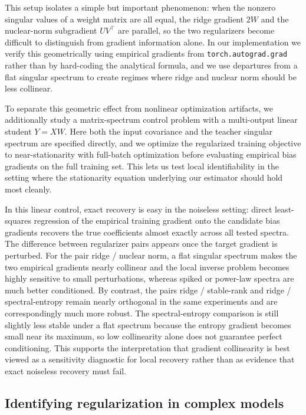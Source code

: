 \documentclass[10pt]{article}
\begin{document}
This setup isolates a simple but important phenomenon: when the nonzero singular values of a weight matrix are all equal, the ridge gradient $2W$ and the nuclear-norm subgradient $UV^\top$ are parallel, so the two regularizers become difficult to distinguish from gradient information alone. In our implementation we verify this geometrically using empirical gradients from \texttt{torch.autograd.grad} rather than by hard-coding the analytical formula, and we use departures from a flat singular spectrum to create regimes where ridge and nuclear norm should be less collinear.

To separate this geometric effect from nonlinear optimization artifacts, we additionally study a matrix-spectrum control problem with a multi-output linear student \(Y = XW\). Here both the input covariance and the teacher singular spectrum are specified directly, and we optimize the regularized training objective to near-stationarity with full-batch optimization before evaluating empirical bias gradients on the full training set. This lets us test local identifiability in the setting where the stationarity equation underlying our estimator should hold most cleanly.

In this linear control, exact recovery is easy in the noiseless setting: direct least-squares regression of the empirical training gradient onto the candidate bias gradients recovers the true coefficients almost exactly across all tested spectra. The difference between regularizer pairs appears once the target gradient is perturbed. For the pair ridge / nuclear norm, a flat singular spectrum makes the two empirical gradients nearly collinear and the local inverse problem becomes highly sensitive to small perturbations, whereas spiked or power-law spectra are much better conditioned. By contrast, the pairs ridge / stable-rank and ridge / spectral-entropy remain nearly orthogonal in the same experiments and are correspondingly much more robust. The spectral-entropy comparison is still slightly less stable under a flat spectrum because the entropy gradient becomes small near its maximum, so low collinearity alone does not guarantee perfect conditioning. This supports the interpretation that gradient collinearity is best viewed as a sensitivity diagnostic for local recovery rather than as evidence that exact noiseless recovery must fail.

\subsection{Identifying regularization in complex models}
\end{document}
